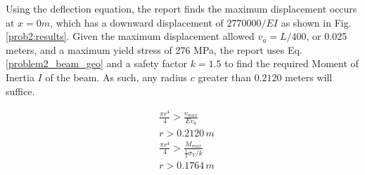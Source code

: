 \documentclass[a4paper]{article}
\begin{document}
Using the deflection equation, the report finds the maximum displacement occurs at $x = 0 m$, which has a downward displacement of $2770000/EI$ as shown in Fig. \ref{prob2:results}. Given the maximum displacement allowed $v_a = L/400$, or 0.025 meters, and a maximum yield stress of 276 MPa, the report uses Eq. \ref{problem2_beam_geo} and a safety factor $k=1.5$ to find the required Moment of Inertia $I$ of the beam. As such, any radius $c$ greater than $0.2120$ meters will suffice.


\begin{equation}
\begin{split}
& \frac{\pi r^4}{4} > \frac{v_{max}}{Ev_a} \\
& r > 0.2120\,m \\
& \frac{\pi r^4}{4} > \frac{M_{max}}{\frac{1}{2}\sigma_Y/ k}\\
& r > 0.1764\,m \\
\end{split}
\label{problem2_beam_geo}
\end{equation}
\end{document}
